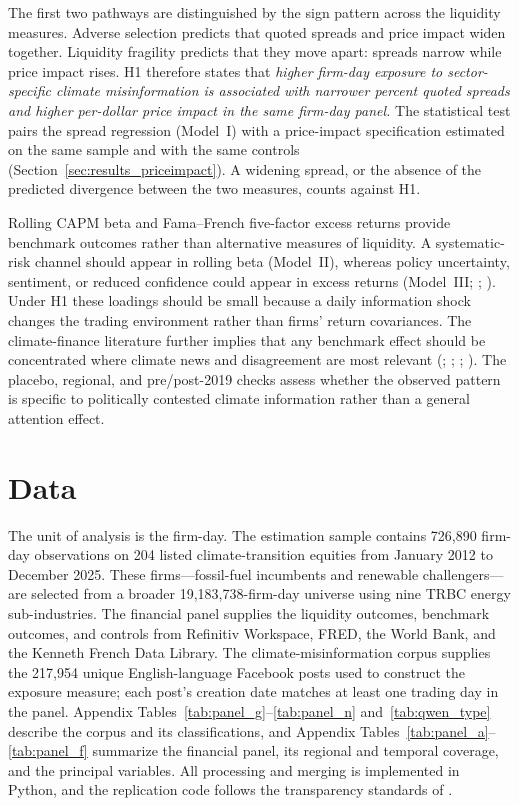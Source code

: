 \documentclass{article}
\theoremstyle{plain}
\begin{document}
The first two pathways are distinguished by the sign pattern across the liquidity measures. Adverse selection predicts that quoted spreads and price impact widen together. Liquidity fragility predicts that they move apart: spreads narrow while price impact rises. H1 therefore states that \emph{higher firm-day exposure to sector-specific climate misinformation is associated with narrower percent quoted spreads and higher per-dollar price impact in the same firm-day panel.} The statistical test pairs the spread regression (Model~I) with a price-impact specification estimated on the same sample and with the same controls (Section~\ref{sec:results_priceimpact}). A widening spread, or the absence of the predicted divergence between the two measures, counts against H1.

Rolling CAPM beta and Fama--French five-factor excess returns provide benchmark outcomes rather than alternative measures of liquidity. A systematic-risk channel should appear in rolling beta (Model~II), whereas policy uncertainty, sentiment, or reduced confidence could appear in excess returns (Model~III; \cite{DeLongShleiferSummersWaldmann1990}; \cite{PastorVeronesi2012}). Under H1 these loadings should be small because a daily information shock changes the trading environment rather than firms' return covariances. The climate-finance literature further implies that any benchmark effect should be concentrated where climate news and disagreement are most relevant (\cite{engle2020hedging}; \cite{bolton2021climate}; \cite{HongLiXu2019}; \cite{pankratz2023climate}). The placebo, regional, and pre/post-2019 checks assess whether the observed pattern is specific to politically contested climate information rather than a general attention effect.

\section{Data}
\label{sec:data}

The unit of analysis is the firm-day. The estimation sample contains 726,890 firm-day observations on 204 listed climate-transition equities from January 2012 to December 2025. These firms---fossil-fuel incumbents and renewable challengers---are selected from a broader 19,183,738-firm-day universe using nine TRBC energy sub-industries. The financial panel supplies the liquidity outcomes, benchmark outcomes, and controls from Refinitiv Workspace, FRED, the World Bank, and the Kenneth French Data Library. The climate-misinformation corpus supplies the 217,954 unique English-language Facebook posts used to construct the exposure measure; each post's creation date matches at least one trading day in the panel. Appendix Tables~\ref{tab:panel_g}--\ref{tab:panel_n} and~\ref{tab:qwen_type} describe the corpus and its classifications, and Appendix Tables~\ref{tab:panel_a}--\ref{tab:panel_f} summarize the financial panel, its regional and temporal coverage, and the principal variables. All processing and merging is implemented in Python, and the replication code follows the transparency standards of \textcite{ChristensenMiguel2018}.
\end{document}
